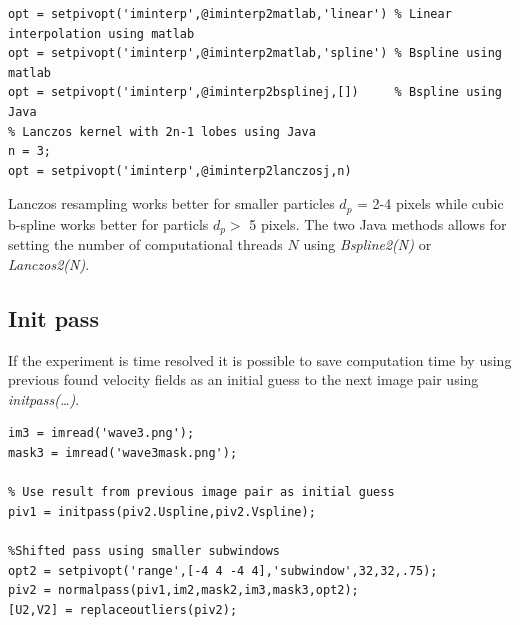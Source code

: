 \documentclass[10pt]{article}
\begin{document}
\begin{lstlisting}
opt = setpivopt('iminterp',@iminterp2matlab,'linear') % Linear interpolation using matlab
opt = setpivopt('iminterp',@iminterp2matlab,'spline') % Bspline using matlab
opt = setpivopt('iminterp',@iminterp2bsplinej,[])     % Bspline using Java
% Lanczos kernel with 2n-1 lobes using Java
n = 3;
opt = setpivopt('iminterp',@iminterp2lanczosj,n)       
\end{lstlisting}
Lanczos resampling works better for smaller particles $d_p$ = 2-4 pixels while cubic b-spline works better for particls $d_p>$ 5 pixels.
The two Java methods allows for setting the number of computational threads $N$ using \emph{Bspline2(N)} or \emph{Lanczos2(N)}.

 \subsection{Init pass}
If the experiment is time resolved it is possible to save computation time by using previous found velocity fields
as an initial guess to the next image pair using \emph{initpass(\ldots)}.

\begin{lstlisting}[caption=Shallow water wave]
% Read in more wave images
im3 = imread('wave3.png');
mask3 = imread('wave3mask.png');
  
% Use result from previous image pair as initial guess
piv1 = initpass(piv2.Uspline,piv2.Vspline);
 
%Shifted pass using smaller subwindows
opt2 = setpivopt('range',[-4 4 -4 4],'subwindow',32,32,.75);
piv2 = normalpass(piv1,im2,mask2,im3,mask3,opt2);
[U2,V2] = replaceoutliers(piv2);
\end{lstlisting}
  
\end{document}
